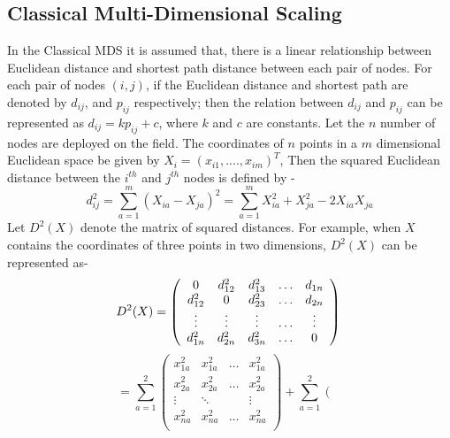 \begin{appendices}
\chapter{Classical Multi-Dimensional Scaling}
In the Classical MDS it is assumed that, there is a linear relationship between Euclidean distance and shortest path distance between each pair of nodes. For each pair of nodes $(i,j)$, if the Euclidean distance and shortest path are denoted by $d_{ij}$, and $p_{ij}$ respectively; then the relation between $d_{ij}$ and $p_{ij}$ can be represented as $d_{ij}=kp_{ij}+c$, where $k$ and $c$ are constants.
Let the $n$ number of nodes are deployed on the field. The coordinates of $n$ points in a $m$ dimensional Euclidean space be given by $X_{i}=(x_{i1},....,x_{im})^{T}$,
Then the squared Euclidean distance between the $i^{th}$ and $j^{th}$ nodes is defined by -
\begin{displaymath}
d^{2}_{ij} = {\sum\limits_{a=1}^m (X_{ia}-X_{ja})^2}=
 {\sum\limits_{a=1}^m X_{ia}^{2}+ X_{ja}^{2}-2X_{ia}X_{ja}}
\label{300}
\end{displaymath}
Let $D^{2}(X)$ denote the matrix of squared distances. For example, when $X$ contains the coordinates of three points in two dimensions, $D^{2}(X)$ can be represented as-
\begin{displaymath}
D^{2}(X) =
\left( \begin{array}{ccccc}
0 & d_{12}^2 & d_{13}^2 & \ldots & d_{1n} \\
d_{12}^2 & 0 & d_{23}^2 & \ldots & d_{2n}\\
\vdots & \vdots & \vdots & \ldots & \vdots \\
d_{1n}^2 & d_{2n}^2 & d_{3n}^2 & \ldots & 0 \\
\end{array} \right)	\\
\end{displaymath}
\begin{displaymath}
= \sum\limits_{a=1}^2{\left( \begin{array}{ccccc}
x_{1a}^2 & x_{1a}^2 & \ldots & x_{1a}^2 \\
x_{2a}^2 & x_{2a}^2 & \ldots & x_{2a}^2 \\
\vdots   & \ddots   &        & \vdots\\
x_{na}^2 & x_{na}^2 & \ldots & x_{na}^2 \\
\end{array} \right)	}+
\sum\limits_{a=1}^2{\left( \begin{array}{ccccc}

\end{array}}
\end{displaymath}
\end{appendices}
